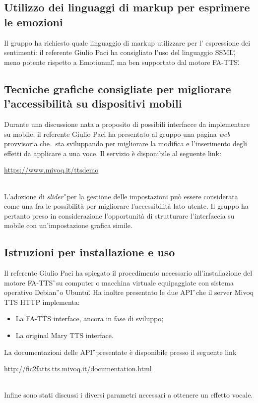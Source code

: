 \subsection{Utilizzo dei linguaggi di markup per esprimere le emozioni}
Il gruppo ha richiesto quale linguaggio di markup utilizzare per l' espressione 
dei sentimenti: il referente Giulio Paci ha consigliato l'uso del linguaggio 
SSML\G, meno potente rispetto a Emotionml\G, ma ben supportato dal motore FA-TTS\G.

\subsection{Tecniche grafiche consigliate per migliorare l'accessibilità su dispositivi mobili}
Durante una discussione nata a proposito di possibili interfacce da implementare su mobile, il referente Giulio Paci ha presentato al gruppo una pagina \textit{web} provvisoria che \AZIENDA\ sta sviluppando per migliorare la modifica e l'inserimento degli effetti da applicare a una voce. Il servizio è disponibile al seguente link:\\
\centerline{\url{https://www.mivoq.it/ttsdemo}} \\
L'adozione di \textit{slider}\G\ per la gestione delle impostazioni può essere considerata come una fra le possibilità per migliorare l'accessibilità lato utente. Il gruppo ha pertanto preso in considerazione l'opportunità di strutturare l'interfaccia su mobile con un'impostazione grafica simile.

\subsection{Istruzioni per installazione e uso}
Il referente Giulio Paci ha spiegato il procedimento necessario all'installazione del motore FA-TTS\G\ su computer o macchina virtuale equipaggiate con sistema operativo 
Debian\G\ o Ubuntu\G. Ha inoltre presentato le due API\G\ che il server Mivoq TTS HTTP implementa:
\begin{itemize}
\item La FA-TTS interface, ancora in fase di sviluppo;
\item La original Mary TTS interface. 
\end{itemize}
La documentazioni delle API\G\  presentate è disponibile presso il seguente link\\
\centerline{\url{http://fic2fatts.tts.mivoq.it/documentation.html}} \\ 
Infine sono stati discussi i diversi parametri necessari a ottenere un effetto vocale.

\newpage

